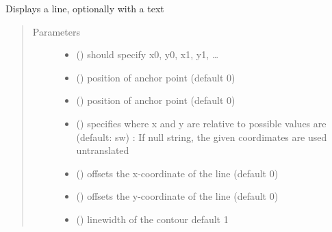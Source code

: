 \documentclass[letterpaper,10pt,english]{sphinxmanual}
\begin{document}
\begin{fulllineitems}
\label{\detokenize{Reference:salabim.AnimateLine}}
Displays a line, optionally with a text
\begin{quote}\begin{description}
\item[{Parameters}] \leavevmode\begin{itemize}
\item {} 
 () \textendash{} should specify x0, y0, x1, y1, …

\item {} 
 () \textendash{} position of anchor point (default 0)

\item {} 
 () \textendash{} position of anchor point (default 0)

\item {} 
 () \textendash{} specifies where x and y are relative to 
possible values are (default: sw) : 
If null string, the given coordimates are used untranslated

\item {} 
 () \textendash{} offsets the x-coordinate of the line (default 0)

\item {} 
 () \textendash{} offsets the y-coordinate of the line (default 0)

\item {} 
 () \textendash{} linewidth of the contour 
default 1


\end{itemize}
\end{description}
\end{quote}
\end{fulllineitems}
\end{document}
